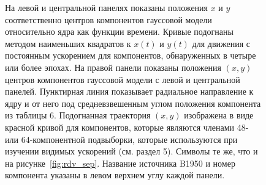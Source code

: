 \begin{figure}[tbh]
 \caption{На левой и центральной панелях показаны положения $x$ и $y$ соответственно центров
компонентов гауссовой модели относительно ядра как функции времени. Кривые подогнаны методом
наименьших квадратов к $x(t)$ и $y(t)$ для движения с постоянным ускорением для компонентов,
обнаруженных в четыре или более эпохах. На правой панели показаны положения $(x, y)$ центров
компонентов гауссовой модели с левой и центральной панелей. Пунктирная линия показывает радиальное
направление к ядру и от него под средневзвешенным углом положения компонента из таблицы 6.
Подогнанная траектория $(x, y)$ изображена в виде красной кривой для компонентов, которые
являются членами 48- или 64-компонентной подвыборки, которые используются при изучении видимых
ускорений (см. раздел 5). Символы те же, что и на рисунке~\ref{fig:rdv_sep}. Название источника
B1950 и номер компонента указаны в левом верхнем углу каждой панели.}
 \label{fig:rdv_xy}
\end{figure}

